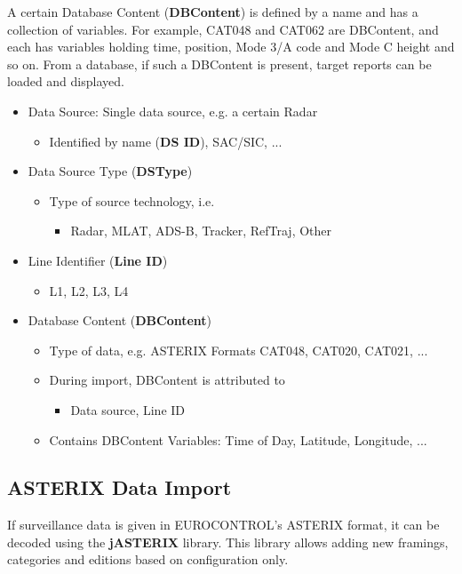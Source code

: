 A certain Database Content (\textbf{DBContent}) is defined by a name and has a collection of variables. For example, CAT048 and CAT062 are DBContent, and each has variables holding time, position, Mode 3/A code and Mode C height and so on. From a database, if such a DBContent is present, target reports can be loaded and displayed.\\

\begin{itemize}
\item Data Source: Single data source, e.g. a certain Radar
\begin{itemize}
\item Identified by name (\textbf{DS ID}), SAC/SIC, ...
\end{itemize}
\item Data Source Type (\textbf{DSType})
\begin{itemize}
\item Type of source technology, i.e.
\begin{itemize}
\item Radar, MLAT, ADS-B, Tracker, RefTraj, Other
\end{itemize}
\end{itemize}
\item Line Identifier (\textbf{Line ID})
\begin{itemize}
\item L1, L2, L3, L4
\end{itemize}
\item Database Content (\textbf{DBContent}) 
\begin{itemize}
\item Type of data, e.g. ASTERIX Formats CAT048, CAT020, CAT021, ...
\item During import, DBContent is attributed to 
\begin{itemize}
\item Data source, Line ID
\end{itemize}
\item Contains DBContent Variables: Time of Day, Latitude, Longitude, ...
\end{itemize}
\end{itemize}

\subsection*{ASTERIX Data Import}
If surveillance data is given in EUROCONTROL's ASTERIX format, it can be decoded using the \textbf{jASTERIX} library. This library allows adding new framings, categories and editions based on configuration only. \\\\

